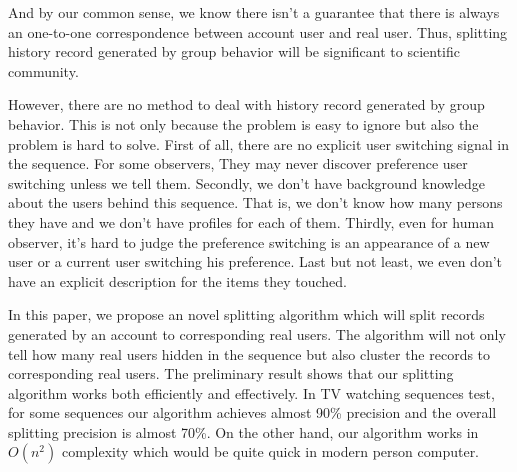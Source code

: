 And by our common sense, we know there isn't a guarantee that there is always an one-to-one correspondence between
account user and real user. Thus, splitting history record generated by group behavior will be significant to
scientific community.

However, there are no method to deal with history record generated by group behavior.
This is not only because the problem is easy to ignore but also the problem is hard to solve.
First of all, there are no explicit user switching signal in the sequence. For some observers,
They may never discover preference user switching unless we tell them. Secondly, we don't have
background knowledge about the users behind this sequence. That is, we don't know how many persons
they have and we don't have profiles for each of them. Thirdly, even for human observer, it's hard
to judge the preference switching is an appearance of a new user or a current user switching his
preference. Last but not least, we even don't have an explicit description for the items they touched.

In this paper, we propose an novel splitting algorithm which will split records generated by an account
to corresponding real users. The algorithm will not only tell how many real users hidden in the sequence
but also cluster the records to corresponding real users. The preliminary result shows that our splitting
algorithm works both efficiently and effectively. In TV watching sequences test, for some sequences our
algorithm achieves almost 90\% precision and the overall splitting precision is almost 70\%. On the other
hand, our algorithm works in $O(n^2)$ complexity which would be quite quick in modern person computer.

